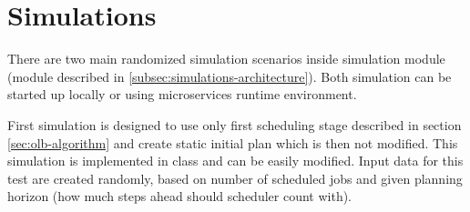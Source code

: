 \section{Simulations}\label{sec:simulations}

There are two main randomized simulation scenarios inside simulation module 
(module described in \ref{subsec:simulations-architecture}).
Both simulation can be started up locally or
using  microservices runtime environment.

First simulation is designed to use only first scheduling stage described in section \ref{sec:olb-algorithm}
and create static initial plan which is then not modified.
This simulation is implemented in  class
and can be easily modified.
Input data for this test are created randomly,
based on number of scheduled jobs and given planning horizon (how much steps ahead should scheduler count with).
